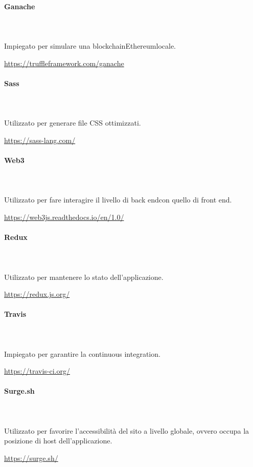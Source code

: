 \paragraph{Ganache} \mbox{}\\ \mbox{}\\
Impiegato per simulare una blockchain\glosp Ethereum\glosp locale.\\
\centerline{\url{https://truffleframework.com/ganache}}

\paragraph{Sass} \mbox{}\\ \mbox{}\\
Utilizzato per generare file CSS ottimizzati.\\
\centerline{\url{https://sass-lang.com/}}

\paragraph{Web3} \mbox{}\\ \mbox{}\\
Utilizzato per fare interagire il livello di back end\glosp con quello di front end\glo. \\
\centerline{\url{https://web3js.readthedocs.io/en/1.0/}}

\paragraph{Redux} \mbox{}\\ \mbox{}\\
Utilizzato per mantenere lo stato dell'applicazione.\\
\centerline{\url{https://redux.js.org/}}

\paragraph{Travis} \mbox{}\\ \mbox{}\\
Impiegato per garantire la continuous integration.\\
\centerline{\url{https://travis-ci.org/}}

\paragraph{Surge.sh} \mbox{}\\ \mbox{}\\
Utilizzato per favorire l'accessibilità del sito a livello globale, ovvero occupa la posizione di host dell'applicazione.\\
\centerline{\url{https://surge.sh/}}

